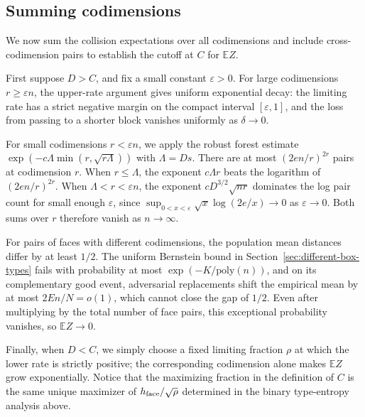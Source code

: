 \subsection{Summing codimensions}\label{sec:sum-codim}
We now sum the collision expectations over all codimensions and include cross-codimension pairs to establish the cutoff at $C$ for $\mathbb E Z$.

First suppose $D>C$, and fix a small constant $\varepsilon>0$. For large codimensions $r\ge\varepsilon n$, the upper-rate argument gives uniform exponential decay: the limiting rate has a strict negative margin on the compact interval $[\varepsilon,1]$, and the loss from passing to a shorter block vanishes uniformly as $\delta\to0$.

For small codimensions $r<\varepsilon n$, we apply the robust forest estimate $\exp(-c\Lambda\min(r,\sqrt{r\Lambda}))$ with $\Lambda=Ds$. There are at most $(2en/r)^{2r}$ pairs at codimension $r$. When $r\le \Lambda$, the exponent $c\Lambda r$ beats the logarithm of $(2en/r)^{2r}$. When $\Lambda<r<\varepsilon n$, the exponent $cD^{3/2}\sqrt{nr}$ dominates the log pair count for small enough $\varepsilon$, since $\sup_{0<x<\varepsilon}\sqrt x\log(2e/x)\to0$ as $\varepsilon\to0$. Both sums over $r$ therefore vanish as $n\to\infty$.

For pairs of faces with different codimensions, the population mean distances differ by at least $1/2$. The uniform Bernstein bound in Section~\ref{sec:different-box-types} fails with probability at most $\exp(-K/\mathrm{poly}(n))$, and on its complementary good event, adversarial replacements shift the empirical mean by at most $2En/N=o(1)$, which cannot close the gap of $1/2$. Even after multiplying by the total number of face pairs, this exceptional probability vanishes, so $\mathbb E Z\to0$.

Finally, when $D<C$, we simply choose a fixed limiting fraction $\rho$ at which the lower rate is strictly positive; the corresponding codimension alone makes $\mathbb E Z$ grow exponentially. Notice that the maximizing fraction in the definition of $C$ is the same unique maximizer of $h_{\rm face}/\sqrt\rho$ determined in the binary type-entropy analysis above.
